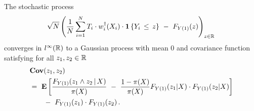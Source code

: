 \begin{ftheorem}
  \label{aa:mean:th}
The stochastic process
\begin{gather}
    \sqrt{N}
    \left( 
  \frac{1}{N}
    \sum_{i=1}^{N} 
    T_i
    \cdot
    w_i^\dagger(X_i)
    \cdot
    \mathbf{1}
    \left\{ Y_i\,\le\, z \right\}
    \ 
    -
    \ 
    F_{Y(1)}(z)
    \right)
    _{z\in\R}
    \,
  \end{gather}
  converges in
  $l^\infty(\mathbb{R})$
  to a Gaussian process with mean 0 and covariance function
  satisfying for all $z_1,z_2\in\mathbb{R}$
\begin{align}
  \label{cov:lp}
 \begin{split}
  &
  \mathbf{Cov}
  (z_1,z_2)
  \\
  &
  =\ 
  \E
  \left[ 
 \frac{
 F_{Y(1)}(z_1 \land z_2\,|\,X)
}{\pi(X)}
\ 
-
\ 
 \frac{1-\pi(X)}{\pi(X)}
 F_{Y(1)}(z_1|X)
 \cdot
 F_{Y(1)}(z_2|X)
  \right]
  \\
  &
  \qquad 
 -
 \ 
 F_{Y(1)}(z_1)
 \cdot
 F_{Y(1)}(z_2)
 \,.
 \end{split}
\end{align}
\end{ftheorem}



